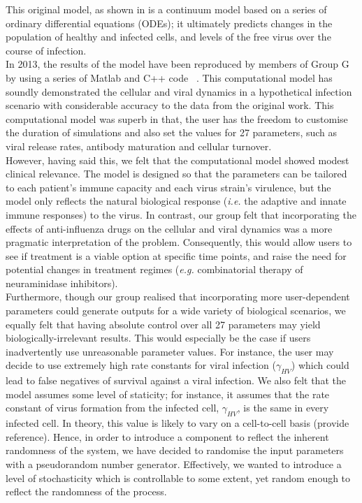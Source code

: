 \documentclass[a4paper, 12pt]{report}
\begin{document}
This original model, as shown in %
is a continuum model based on a series of ordinary differential equations (ODEs); it ultimately predicts changes in the population of healthy and infected cells, and levels of the free virus over the course of infection. \\

In 2013, the results of the model have been reproduced by members of Group G by using a series of Matlab and C++ code ~\cite{GroupG}. This computational model has soundly demonstrated the cellular and viral dynamics in a hypothetical infection scenario with considerable accuracy to the data from the original work. This computational model was superb in that, the user has the freedom to customise the duration of simulations and also set the values for 27 parameters, such as viral release rates, antibody maturation and cellular turnover. \\


However, having said this, we felt that the computational model showed modest clinical relevance. The model is designed so that the parameters can be tailored to each patient's immune capacity and each virus strain's virulence, but the model only reflects the natural biological response (\emph{i.e.} the adaptive and innate immune responses) to the virus. In contrast, our group felt that incorporating the effects of anti-influenza drugs on the cellular and viral dynamics was a more pragmatic interpretation of the problem. Consequently, this would allow users to see if treatment is a viable option at specific time points, and raise the need for potential changes in treatment regimes (\emph{e.g.} combinatorial therapy of neuraminidase inhibitors). \\

Furthermore, though our group realised that incorporating more user-dependent parameters could generate outputs for a wide variety of biological scenarios, we equally felt that having absolute control over all 27 parameters may yield biologically-irrelevant results. This would especially be the case if users inadvertently use unreasonable parameter values. For instance, the user may decide to use extremely high rate constants for viral infection ($\gamma_{HV}$) which could lead to false negatives of survival against a viral infection. We also felt that the model assumes some level of staticity; for instance, it assumes that the rate constant of virus formation from the infected cell, $\gamma_{HV}$, is the same in every infected cell. In theory, this value is likely to vary on a cell-to-cell basis (provide reference). Hence, in order to introduce a component to reflect the inherent randomness of the system, we have decided to randomise the input parameters with a pseudorandom number generator. Effectively, we wanted to introduce a level of stochasticity which is controllable to some extent, yet random enough to reflect the randomness of the process. \\
\end{document}
